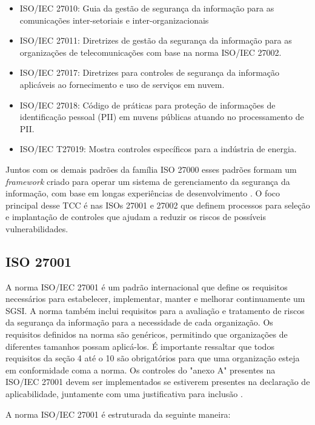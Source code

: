  \begin{itemize}   
    \item ISO/IEC  27010: Guia da gestão de segurança da informação para as comunicações inter-setoriais e inter-organizacionais
    \item ISO/IEC  27011: Diretrizes de gestão da segurança da informação  para as organizações de telecomunicações com base na norma ISO/IEC 27002. 
    \item ISO/IEC  27017: Diretrizes para controles de segurança da informação aplicáveis ao fornecimento e uso de serviços em nuvem.
    \item ISO/IEC  27018: Código de práticas para proteção de informações de identificação pessoal (PII) em nuvens públicas atuando no processamento de PII.
    \item ISO/IEC T27019: Mostra controles específicos para a indústria de energia.
    
\end{itemize}

Juntos com os demais padrões da família ISO 27000 esses padrões formam um \textit{framework} criado para operar um sistema de gerenciamento da segurança da informação, com base em longas experiências de desenvolvimento \cite{disterer2013}. O foco principal desse TCC é nas ISOs 27001 e 27002 que definem processos para seleção e implantação de controles que ajudam a reduzir os riscos de possíveis vulnerabilidades.


\subsection{ISO 27001}

A norma ISO/IEC 27001 é um padrão internacional que define os requisitos necessários para estabelecer, implementar, manter e melhorar continuamente um SGSI. A norma também inclui requisitos para a avaliação e tratamento de riscos da segurança da informação para a necessidade de cada organização. Os requisitos definidos na norma são genéricos, permitindo que organizações de diferentes tamanhos possam aplicá-los. É importante ressaltar que todos requisitos da seção 4 até o 10 são obrigatórios para que uma organização esteja em conformidade coma a norma. Os controles do "anexo A" {} presentes na ISO/IEC 27001 devem ser implementados se estiverem presentes na declaração de aplicabilidade, juntamente com uma justificativa para inclusão \cite{ISOPDF}. 

A norma ISO/IEC 27001 \cite{ISOPDF} é estruturada da seguinte maneira:

